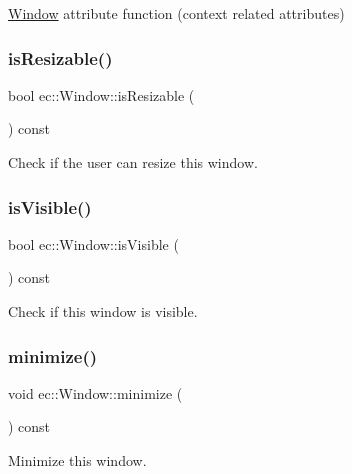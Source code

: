 \mbox{\hyperlink{classec_1_1_window}{Window}} attribute function (context related attributes) \mbox{\label{classec_1_1_window_a8af5e954522cc427ab1fe5b6a28f5328}} 
\subsubsection{\texorpdfstring{is\+Resizable()}{isResizable()}}
{\footnotesize\ttfamily bool ec\+::\+Window\+::is\+Resizable (\begin{DoxyParamCaption}{ }\end{DoxyParamCaption}) const}

Check if the user can resize this window. \mbox{\label{classec_1_1_window_a0f4ab1e221cbf5ce5b5a1183a51e38cd}} 
\subsubsection{\texorpdfstring{is\+Visible()}{isVisible()}}
{\footnotesize\ttfamily bool ec\+::\+Window\+::is\+Visible (\begin{DoxyParamCaption}{ }\end{DoxyParamCaption}) const}

Check if this window is visible. \mbox{\label{classec_1_1_window_a03862c4545b0ad415438f4b8c26849ef}} 
\subsubsection{\texorpdfstring{minimize()}{minimize()}}
{\footnotesize\ttfamily void ec\+::\+Window\+::minimize (\begin{DoxyParamCaption}{ }\end{DoxyParamCaption}) const}

Minimize this window. \mbox{\label{classec_1_1_window_aed6043c22655278bcb7d196b2a4ded82}} 
